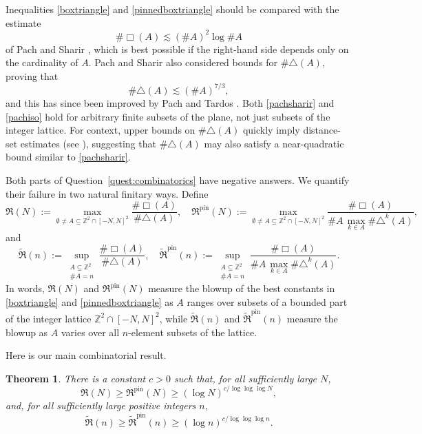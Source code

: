 \documentclass[10pt,a4paper]{amsart}
\newtheorem{theorem}{Theorem}[section]
\numberwithin{equation}{section}
\renewcommand{\geq}{\geqslant}
\begin{document}
Inequalities \eqref{boxtriangle} and \eqref{pinnedboxtriangle} should be compared with the estimate
\begin{equation}\label{pachsharir}
\#\Box(A)\lesssim (\#A)^2\log\#A
\end{equation}
of Pach and Sharir \cite{PachSharir}, which is best possible if the right-hand side depends only on the cardinality of $A$. Pach and Sharir also considered bounds for $\#\triangle(A)$, proving that
\begin{equation}\label{pachiso}
\#\triangle(A)\lesssim (\#A)^{7/3},
\end{equation}
and this has since been improved by Pach and Tardos \cite{PachTardos}. Both \eqref{pachsharir} and \eqref{pachiso} hold for arbitrary finite subsets of the plane, not just subsets of the integer lattice. For context, upper bounds on $\#\triangle(A)$ quickly imply distance-set estimates (see \cite{PachSharir,PachTardos, TV}), suggesting that $\#\triangle(A)$ may also satisfy a near-quadratic bound similar to \eqref{pachsharir}.

Both parts of Question~\ref{quest:combinatorics} have negative answers. We quantify their failure in two natural finitary ways. Define
\[ \mathfrak{R}(N) := \max_{\emptyset\ne A\subseteq\mathbb{Z}^2\cap[-N,N]^2} \frac{\#\Box(A)}{\#\triangle(A)},
\quad \mathfrak{R}^{\mathrm{pin}}(N) := \max_{\emptyset\ne A\subseteq\mathbb{Z}^2\cap[-N,N]^2} \frac{\#\Box(A)}{\#A\, \max_{k\in A}\limits \#\triangle^k(A)}, \]
and
\[ \widetilde{\mathfrak{R}}(n) := \sup_{\substack{A\subseteq\mathbb{Z}^2\\ \#A=n}} \frac{\#\Box(A)}{\#\triangle(A)},
\quad \widetilde{\mathfrak{R}}^{\mathrm{pin}}(n) := \sup_{\substack{A\subseteq\mathbb{Z}^2\\ \#A=n}} \frac{\#\Box(A)}{\#A\, \max_{k\in A}\limits \#\triangle^k(A)}. \]
In words, $\mathfrak{R}(N)$ and $\mathfrak{R}^{\mathrm{pin}}(N)$ measure the blowup of the best constants in \eqref{boxtriangle} and \eqref{pinnedboxtriangle} as $A$ ranges over subsets of a bounded part of the integer lattice $\mathbb{Z}^2\cap[-N,N]^2$, while $\widetilde{\mathfrak{R}}(n)$ and $\widetilde{\mathfrak{R}}^{\mathrm{pin}}(n)$ measure the blowup as $A$ varies over all $n$-element subsets of the lattice.

Here is our main combinatorial result.

\begin{theorem}\label{thm:combinatorics}
There is a constant $c>0$ such that, for all sufficiently large $N$,
\[ \mathfrak{R}(N) \geq \mathfrak{R}^{\mathrm{pin}}(N) \geq (\log N)^{c/\log\log\log N}, \]
and, for all sufficiently large positive integers $n$,
\[ \widetilde{\mathfrak{R}}(n) \geq \widetilde{\mathfrak{R}}^{\mathrm{pin}}(n) \geq (\log n)^{c/\log\log\log n}. \]
\end{theorem}
\end{document}
